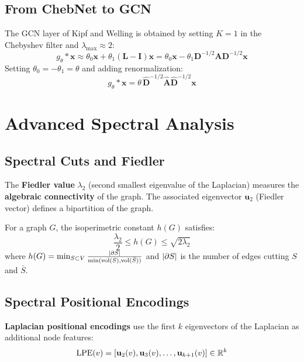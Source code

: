 \subsection{From ChebNet to GCN}

\begin{proposition}
The GCN layer of Kipf and Welling is obtained by setting $K = 1$ in the
Chebyshev filter and $\lambda_{\max} \approx 2$:
\[
    g_\theta * \mathbf{x} \approx \theta_0 \mathbf{x} + \theta_1
    (\mathbf{L} - \mathbf{I})\mathbf{x}
    = \theta_0 \mathbf{x} - \theta_1 \mathbf{D}^{-1/2}\mathbf{A}\mathbf{D}^{-1/2}\mathbf{x}
\]
Setting $\theta_0 = -\theta_1 = \theta$ and adding renormalization:
\[
    g_\theta * \mathbf{x} = \theta\,\hat{\mathbf{D}}^{-1/2}\hat{\mathbf{A}}
    \hat{\mathbf{D}}^{-1/2}\mathbf{x}
\]
\end{proposition}

\section{Advanced Spectral Analysis}

\subsection{Spectral Cuts and Fiedler}

\begin{definition}
The \textbf{Fiedler value} $\lambda_2$ (second smallest eigenvalue of the
Laplacian) measures the \textbf{algebraic connectivity} of the graph. The
associated eigenvector $\mathbf{u}_2$ (Fiedler vector) defines a bipartition
of the graph.
\end{definition}

\begin{theorem}
For a graph $G$, the isoperimetric constant $h(G)$ satisfies:
\[
    \frac{\lambda_2}{2} \leq h(G) \leq \sqrt{2\lambda_2}
\]
where $h(G) = \min_{S \subset V} \frac{\left| \partial S \right|}{\min(\mathrm{vol}(S),
\mathrm{vol}(\bar{S}))}$ and $\left| \partial S \right|$ is the number of edges
cutting $S$ and $\bar{S}$.
\end{theorem}

\subsection{Spectral Positional Encodings}

\begin{definition}
\textbf{Laplacian positional encodings} use the first $k$ eigenvectors of
the Laplacian as additional node features:
\[
    \text{LPE}(v) = [\mathbf{u}_2(v), \mathbf{u}_3(v), \ldots, \mathbf{u}_{k+1}(v)]
    \in \mathbb{R}^k
\]
\end{definition}

